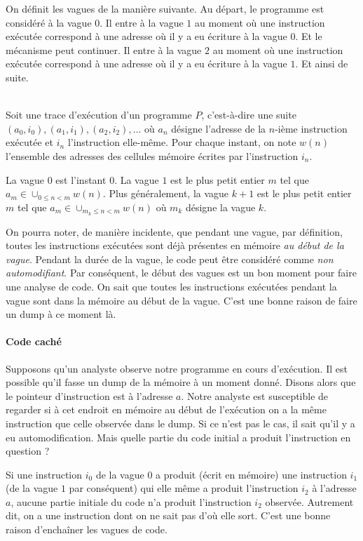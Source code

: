 \documentclass{book}
\newenvironment{formalisme}[1]{%
	\def\FrameCommand{\fboxrule=\FrameRule\fboxsep=\FrameSep \fcolorbox{red!10}{red!5}}%
	\MakeFramed {\advance\hsize-\width \FrameRestore}
	\noindent {\bf #1}\\
}%
{\endMakeFramed}
\begin{document}
On définit les vagues de la manière suivante. Au départ, le programme est considéré à la vague $0$. Il entre à la vague $1$ au moment où une instruction exécutée correspond à une adresse où il y a eu écriture à la vague $0$. Et le mécanisme peut continuer. Il entre à la vague $2$ au moment où une instruction exécutée correspond à une adresse où il y a eu écriture à la vague $1$. Et ainsi de suite. 

\begin{formalisme}{Vague}
Soit une trace d'exécution d'un programme $P$, c'est-à-dire une suite $(a_0, i_0), (a_1, i_1), (a_2,i_2), \ldots$ où $a_n$ désigne l'adresse de la $n$-ième instruction exécutée et $i_n$ l'instruction elle-même. Pour chaque instant, on note $w(n)$ l'ensemble des adresses des cellules mémoire écrites par l'instruction $i_n$. 

 La vague $0$ est l'instant $0$.  La vague $1$ est le plus petit entier $m$ tel que $a_m \in \cup_{0 \leq n < m} w(n)$. Plus généralement, la vague $k+1$ est le plus petit entier $m$ tel que $a_m \in \cup_{  m_k \leq n < m} w(n)$ où $m_k$ désigne la vague $k$. 
\end{formalisme}

On pourra noter, de manière incidente, que pendant une vague, par définition, toutes les instructions exécutées sont déjà présentes en mémoire {\em au début de la vague}. Pendant la durée de la vague, le code peut être considéré comme {\em non automodifiant}. Par conséquent, le début des vagues est un bon moment pour faire une analyse de code. On sait que toutes les instructions exécutées pendant la vague sont dans  la mémoire au début de la vague. C'est une bonne raison de faire un dump à ce moment là. 

\paragraph{Code caché}

Supposons qu'un analyste observe notre programme en cours d'exécution. Il est possible qu'il fasse un dump de la mémoire à un moment donné. Disons alors que le pointeur d'instruction est à l'adresse $a$. Notre analyste est susceptible de regarder si à cet endroit en mémoire au début de l'exécution on a la même instruction que celle observée dans le dump. Si ce n'est pas le cas, il sait qu'il y a eu automodification. Mais quelle partie du code initial a produit l'instruction en question ?

Si une instruction $i_0$ de la vague $0$ a produit (écrit en mémoire) une instruction $i_1$ (de la vague $1$ par conséquent) qui elle même a produit l'instruction $i_2$  à l'adresse $a$, aucune partie initiale du code n'a produit l'instruction $i_2$ observée. Autrement dit, on a une instruction dont on ne sait pas d'où elle sort.  C'est une bonne raison d'enchaîner les vagues de code.
\end{document}
